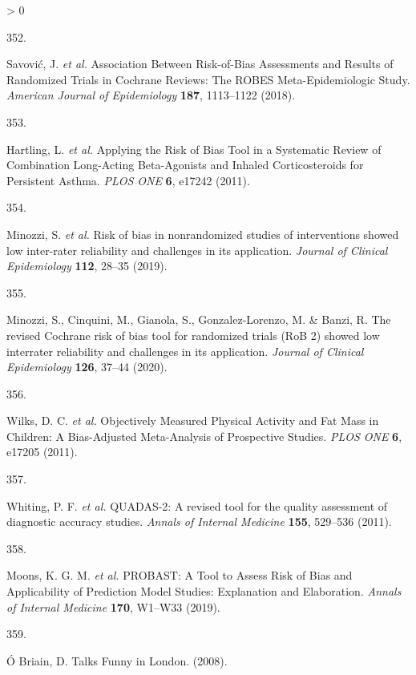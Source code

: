 \documentclass[a4paper, twoside]{templates/ociamthesis}
\newlength{\cslhangindent}
\newlength{\csllabelwidth}
\newenvironment{CSLReferences}[3] %
 {%
  \setlength{\parindent}{0pt}
  \ifodd #1 \everypar{\setlength{\hangindent}{\cslhangindent}}\ignorespaces\fi
  \ifnum #2 > 0
  \setlength{\parskip}{#2\baselineskip}
  \fi
 }%
 {}
\newcommand{\CSLLeftMargin}[1]{\parbox[t]{\maxof{\widthof{#1}}{\csllabelwidth}}{#1}}
\newcommand{\CSLRightInline}[1]{\parbox[t]{\linewidth - \csllabelwidth}{#1}}
\begin{document}
\begin{CSLReferences}{0}{0}
\leavevmode\hypertarget{ref-savovic2018}{}%
\CSLLeftMargin{352. }
\CSLRightInline{Savović, J. \emph{et al.} Association {Between Risk}-of-{Bias Assessments} and {Results} of {Randomized Trials} in {Cochrane Reviews}: The {ROBES Meta}-{Epidemiologic Study}. \emph{American Journal of Epidemiology} \textbf{187}, 1113--1122 (2018).}

\leavevmode\hypertarget{ref-hartling2011}{}%
\CSLLeftMargin{353. }
\CSLRightInline{Hartling, L. \emph{et al.} Applying the {Risk} of {Bias Tool} in a {Systematic Review} of {Combination Long}-{Acting Beta}-{Agonists} and {Inhaled Corticosteroids} for {Persistent Asthma}. \emph{PLOS ONE} \textbf{6}, e17242 (2011).}

\leavevmode\hypertarget{ref-minozzi2019}{}%
\CSLLeftMargin{354. }
\CSLRightInline{Minozzi, S. \emph{et al.} Risk of bias in nonrandomized studies of interventions showed low inter-rater reliability and challenges in its application. \emph{Journal of Clinical Epidemiology} \textbf{112}, 28--35 (2019).}

\leavevmode\hypertarget{ref-minozzi2020}{}%
\CSLLeftMargin{355. }
\CSLRightInline{Minozzi, S., Cinquini, M., Gianola, S., Gonzalez-Lorenzo, M. \& Banzi, R. The revised {Cochrane} risk of bias tool for randomized trials ({RoB} 2) showed low interrater reliability and challenges in its application. \emph{Journal of Clinical Epidemiology} \textbf{126}, 37--44 (2020).}

\leavevmode\hypertarget{ref-wilks2011}{}%
\CSLLeftMargin{356. }
\CSLRightInline{Wilks, D. C. \emph{et al.} Objectively {Measured Physical Activity} and {Fat Mass} in {Children}: A {Bias}-{Adjusted Meta}-{Analysis} of {Prospective Studies}. \emph{PLOS ONE} \textbf{6}, e17205 (2011).}

\leavevmode\hypertarget{ref-whiting2011}{}%
\CSLLeftMargin{357. }
\CSLRightInline{Whiting, P. F. \emph{et al.} {QUADAS}-2: A revised tool for the quality assessment of diagnostic accuracy studies. \emph{Annals of Internal Medicine} \textbf{155}, 529--536 (2011).}

\leavevmode\hypertarget{ref-moons2019}{}%
\CSLLeftMargin{358. }
\CSLRightInline{Moons, K. G. M. \emph{et al.} {PROBAST}: A {Tool} to {Assess Risk} of {Bias} and {Applicability} of {Prediction Model Studies}: Explanation and {Elaboration}. \emph{Annals of Internal Medicine} \textbf{170}, W1--W33 (2019).}

\leavevmode\hypertarget{ref-obriain2008}{}%
\CSLLeftMargin{359. }
\CSLRightInline{Ó Briain, D. Talks {Funny} in {London}. (2008).}


\end{CSLReferences}
\end{document}
